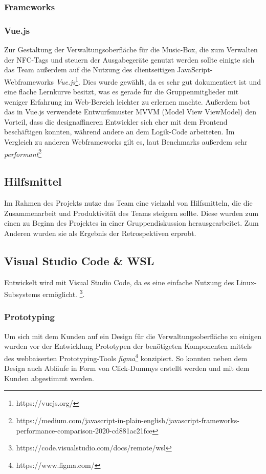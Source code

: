 \documentclass[10pt, a4paper, draft]{article}
\begin{document}
\subsubsection{Frameworks}
\subsubsection*{Vue.js}
Zur Gestaltung der Verwaltungsoberfläche für die Music-Box, die zum Verwalten der NFC-Tags und steuern der Ausgabegeräte genutzt werden sollte einigte
sich das Team außerdem auf die Nutzung des clientseitigen JavaScript-Webframeworks \textit{Vue.js}\footnote{https://vuejs.org/}.
Dies wurde gewählt, da es sehr gut dokumentiert ist und eine flache Lernkurve besitzt, was es gerade für die Gruppenmitglieder mit weniger Erfahrung im Web-Bereich leichter zu erlernen machte.
Außerdem bot das in Vue.js verwendete Entwurfsmuster MVVM (Model View ViewModel) den Vorteil, dass die designaffineren Entwickler sich eher mit dem Frontend beschäftigen konnten,
während andere an dem Logik-Code arbeiteten. Im Vergleich zu anderen Webframeworks gilt es, laut Benchmarks außerdem sehr \textit{performant}\footnote{https://medium.com/javascript-in-plain-english/javascript-frameworks-performance-comparison-2020-cd881ac21fce}


\subsection{Hilfsmittel}
Im Rahmen des Projekts nutze das Team eine vielzahl von Hilfsmitteln, die die Zusammenarbeit und Produktivität des Teams steigern sollte.
Diese wurden zum einen zu Beginn des Projektes in einer Gruppendiskussion herausgearbeitet. Zum Anderen wurden sie als Ergebnis der Retrospektiven erprobt.

\subsection*{Visual Studio Code & WSL}

Entwickelt wird mit Visual Studio Code, da es eine einfache Nutzung des Linux-Subsystems ermöglicht. \footnote{https://code.visualstudio.com/docs/remote/wsl}.

\subsubsection*{Prototyping}
Um sich mit dem Kunden auf ein Design für die Verwaltungsoberfläche zu einigen wurden vor der Entwicklung Prototypen der benötigeten Komponenten mittels des webbaiserten
Prototyping-Tools \textit{figma}\footnote{https://www.figma.com/} konzipiert. So konnten neben dem Design auch Abläufe in Form von \glqq Click-Dummys\grqq{} erstellt werden und mit dem Kunden abgestimmt werden.
\end{document}
